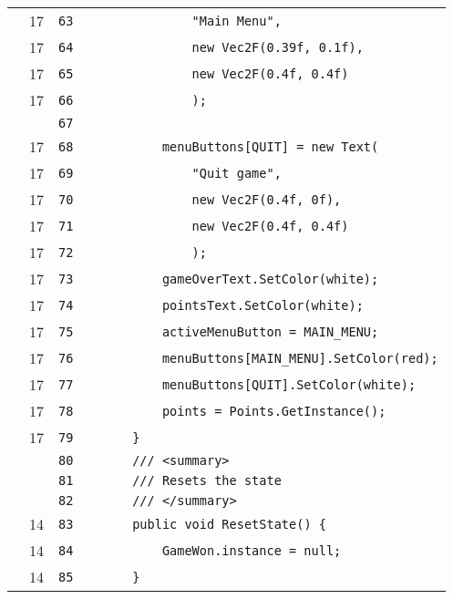 \documentclass[a4paper,landscape,10pt]{article}
\begin{document}
\begin{longtable}[l]{lrrll}
\cellcolor{green} & 17 & \verb~63~ & & \verb~            "Main Menu",~\\
\cellcolor{green} & 17 & \verb~64~ & & \verb~            new Vec2F(0.39f, 0.1f),~\\
\cellcolor{green} & 17 & \verb~65~ & & \verb~            new Vec2F(0.4f, 0.4f)~\\
\cellcolor{green} & 17 & \verb~66~ & & \verb~            );~\\
\cellcolor{gray} &  & \verb~67~ & & \verb~~\\
\cellcolor{green} & 17 & \verb~68~ & & \verb~        menuButtons[QUIT] = new Text(~\\
\cellcolor{green} & 17 & \verb~69~ & & \verb~            "Quit game",~\\
\cellcolor{green} & 17 & \verb~70~ & & \verb~            new Vec2F(0.4f, 0f),~\\
\cellcolor{green} & 17 & \verb~71~ & & \verb~            new Vec2F(0.4f, 0.4f)~\\
\cellcolor{green} & 17 & \verb~72~ & & \verb~            );~\\
\cellcolor{green} & 17 & \verb~73~ & & \verb~        gameOverText.SetColor(white);~\\
\cellcolor{green} & 17 & \verb~74~ & & \verb~        pointsText.SetColor(white);~\\
\cellcolor{green} & 17 & \verb~75~ & & \verb~        activeMenuButton = MAIN_MENU;~\\
\cellcolor{green} & 17 & \verb~76~ & & \verb~        menuButtons[MAIN_MENU].SetColor(red);~\\
\cellcolor{green} & 17 & \verb~77~ & & \verb~        menuButtons[QUIT].SetColor(white);~\\
\cellcolor{green} & 17 & \verb~78~ & & \verb~        points = Points.GetInstance();~\\
\cellcolor{green} & 17 & \verb~79~ & & \verb~    }~\\
\cellcolor{gray} &  & \verb~80~ & & \verb~    /// <summary>~\\
\cellcolor{gray} &  & \verb~81~ & & \verb~    /// Resets the state~\\
\cellcolor{gray} &  & \verb~82~ & & \verb~    /// </summary>~\\
\cellcolor{green} & 14 & \verb~83~ & & \verb~    public void ResetState() {~\\
\cellcolor{green} & 14 & \verb~84~ & & \verb~        GameWon.instance = null;~\\
\cellcolor{green} & 14 & \verb~85~ & & \verb~    }~\\

\end{longtable}
\end{document}
